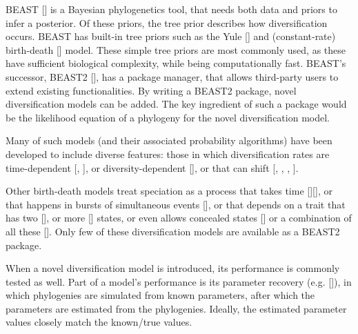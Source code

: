 \documentclass{article}
\begin{document}
BEAST [\cite{drummond2007beast}] is a Bayesian phylogenetics tool, 
that needs both data and priors to infer a posterior.
Of these priors, the tree prior describes how diversification occurs.
BEAST has built-in tree priors such as the Yule [\cite{yule}] and 
(constant-rate) birth-death [\cite{nee1994reconstructed}] model.
These simple tree priors are most commonly used, as these 
have sufficient biological complexity, while being computationally fast.
BEAST's successor, BEAST2 [\cite{bouckaert2014beast}],
has a package manager, that allows third-party users to extend existing 
functionalities.
By writing a BEAST2 package, novel diversification models can be added.
The key ingredient of such a package would be the likelihood equation
of a phylogeny for the novel diversification model.

Many of such models (and their associated probability 
algorithms) have been
developed to include diverse features: those in which diversification rates are 
time-dependent [\cite{nee1994reconstructed}, \cite{rabosky2008explosive}], 
or diversity-dependent [\cite{etienne2011diversity}],
or that can shift [\cite{etienne2012conceptual}, 
\cite{rabosky2014automatic}, \cite{alfaro2009nine}, \cite{laudanno2018sls}].

Other birth-death models treat speciation as a process that takes 
time [\cite{rosindell2010protracted}][\cite{etienne2012prolonging}], 
or that happens in bursts of simultaneous 
events [\cite{laudanno2018mbd}], or that
depends on a trait that has two [\cite{maddison2007estimating}], 
or more [\cite{fitzjohn2012diversitree}] states,
or even allows concealed states [\cite{beaulieu2016detecting}] 
or a combination of all these [\cite{herrera2018detecting}].
Only few of these diversification models are available as a BEAST2 package.

When a novel diversification model is introduced,
its performance is commonly tested as well.
Part of a model's performance is its parameter 
recovery (e.g. [\cite{etienne2014estimating}]),
in which phylogenies are simulated from known parameters, 
after which the parameters are estimated from the phylogenies.
Ideally, the estimated parameter values closely match the known/true values.
\end{document}
